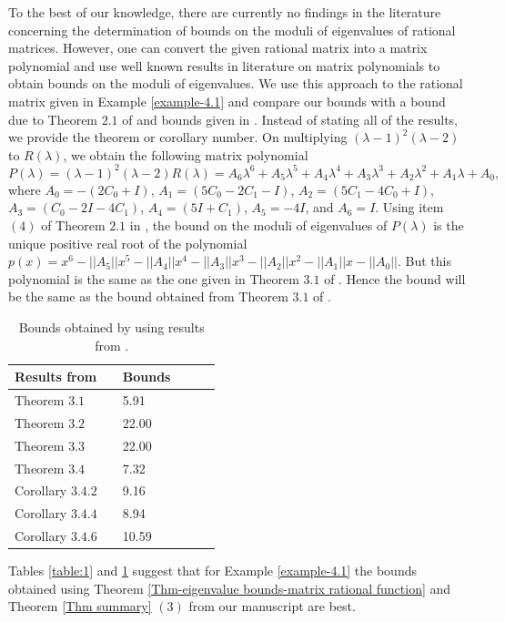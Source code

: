 \documentclass[12pt, reqno]{amsart}
\theoremstyle{definition}
\theoremstyle{remark}
\numberwithin{equation}{section}
\begin{document}
To the best of our knowledge, there are currently no findings in the 
literature concerning the determination of bounds on the moduli of eigenvalues 
of rational matrices. However, one can convert the given rational matrix into a 
matrix polynomial and use well known results in literature on matrix polynomials 
to obtain bounds on the moduli of eigenvalues. We use this approach to the 
rational matrix given in Example \ref{example-4.1} and compare our bounds with a 
bound due to Theorem $2.1$ of \cite{Bini} and bounds given in \cite{Le-Du-Nguyen}. 
Instead of stating all of the results, we provide the theorem or corollary number. 
On multiplying $(\lambda -1)^2 (\lambda-2)$ to $R(\lambda)$, 
we obtain the following matrix polynomial 
\begin{equation}
P(\lambda) = (\lambda -1)^2 (\lambda-2) R(\lambda)
= A_6\lambda^6 +A_5 \lambda^5 +A_4\lambda^4 + A_3\lambda^3 + A_2\lambda^2 +A_1\lambda+A_0,
\end{equation}
where $A_0 =-(2C_0+I)$, $A_1 =(5C_0-2C_1-I)$, $A_2 =(5C_1-4C_0+I)$, $A_3 =
(C_0-2I-4C_1)$, $A_4 =(5I+C_1)$, $A_5 =-4I$, and $A_6 =I$. 
Using item $(4)$ of Theorem $2.1$ in \cite{Bini}, the bound on the moduli of 
eigenvalues of $P(\lambda)$ is the unique positive real root of the polynomial 
$p(x) =x^6-||A_5|| x^5 -||A_4||x^4 - ||A_3||x^3 - ||A_2||x^2 -||A_1||x-||A_0||$. 
But this polynomial is the same as the one given in Theorem $3.1$ of \cite{Le-Du-Nguyen}. 
Hence the bound will be the same as the bound obtained from Theorem $3.1$ of 
\cite{Le-Du-Nguyen}.

\begin{table}[h!]
\centering
\begin{tabular}{l l l l l l}
\hline
Results from \cite{Le-Du-Nguyen} & \hspace{5cm} & Bounds\\ [0.5ex] 
\hline
Theorem $3.1$  & \hspace{5cm} & 5.91 \\
Theorem $3.2$  & \hspace{5cm} & 22.00 \\
Theorem $3.3$  & \hspace{5cm} & 22.00 \\
Theorem $3.4$  & \hspace{5cm} & 7.32 \\
Corollary $3.4.2$  & \hspace{5cm} & 9.16 \\
Corollary $3.4.4$  & \hspace{5cm} & 8.94 \\
Corollary $3.4.6$  & \hspace{5cm} & 10.59 \\[1ex]
\hline
\end{tabular}
\vspace{0.2cm}
\caption{Bounds obtained by using results from \cite{Le-Du-Nguyen}.}
\label{table:2}
\end{table} 
\noindent
Tables \ref{table:1} and \ref{table:2} suggest that for Example \ref{example-4.1} 
the bounds obtained using Theorem \ref{Thm-eigenvalue bounds-matrix rational function} 
and Theorem \ref{Thm summary} $(3)$ from our manuscript are best.
\end{document}
